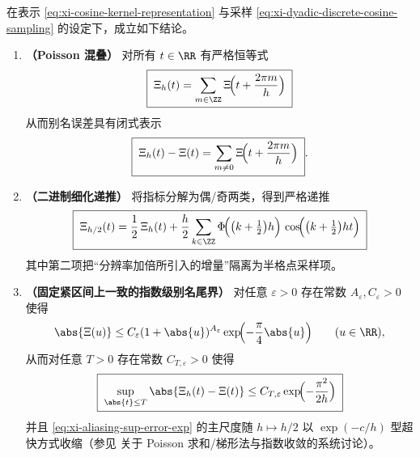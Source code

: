 \begin{theorem}\label{thm:xi-dyadic-aliasing-poisson-and-error}
在表示 \eqref{eq:xi-cosine-kernel-representation} 与采样 \eqref{eq:xi-dyadic-discrete-cosine-sampling} 的设定下，成立如下结论。
\begin{enumerate}
  \item \textbf{（Poisson 混叠）}
  对所有 \(t\in\RR\) 有严格恒等式
  \begin{equation}\label{eq:xi-poisson-aliasing-identity}
  \boxed{\;
  \Xi_h(t)=\sum_{m\in\ZZ}\Xi\!\Bigl(t+\frac{2\pi m}{h}\Bigr)\;}
  \end{equation}
  从而别名误差具有闭式表示
  \begin{equation}\label{eq:xi-poisson-aliasing-error-closed-form}
  \boxed{\;
  \Xi_h(t)-\Xi(t)=\sum_{m\neq 0}\Xi\!\Bigl(t+\frac{2\pi m}{h}\Bigr)\; }.
  \end{equation}
  \item \textbf{（二进制细化递推）}
  将指标分解为偶/奇两类，得到严格递推
  \begin{equation}\label{eq:xi-dyadic-refinement-recursion}
  \boxed{\;
  \Xi_{h/2}(t)
  =\frac12\,\Xi_h(t)
  +\frac{h}{2}\sum_{k\in\ZZ}\Phi\!\Bigl(\bigl(k+\tfrac12\bigr)h\Bigr)\,
  \cos\!\Bigl(\bigl(k+\tfrac12\bigr)ht\Bigr)\;}
  \end{equation}
  其中第二项把“分辨率加倍所引入的增量”隔离为半格点采样项。
  \item \textbf{（固定紧区间上一致的指数级别名尾界）}
  对任意 \(\varepsilon>0\) 存在常数 \(A_\varepsilon,C_\varepsilon>0\) 使得
  \begin{equation}\label{eq:xi-critical-line-exponential-decay}
  \abs{\Xi(u)}\le C_\varepsilon(1+\abs{u})^{A_\varepsilon}\exp\!\Bigl(-\frac{\pi}{4}\abs{u}\Bigr)\qquad(u\in\RR),
  \end{equation}
  从而对任意 \(T>0\) 存在常数 \(C_{T,\varepsilon}>0\) 使得
  \begin{equation}\label{eq:xi-aliasing-sup-error-exp}
  \boxed{\;
  \sup_{\abs{t}\le T}\abs{\Xi_h(t)-\Xi(t)}
  \le C_{T,\varepsilon}\exp\!\Bigl(-\frac{\pi^{2}}{2h}\Bigr)\;}
  \end{equation}
  并且 \eqref{eq:xi-aliasing-sup-error-exp} 的主尺度随 \(h\mapsto h/2\) 以 \(\exp(-c/h)\) 型超快方式收缩（参见 \cite{TrefethenWeideman2014TrapezoidalRule} 关于 Poisson 求和/梯形法与指数收敛的系统讨论）。
\end{enumerate}
\end{theorem}
